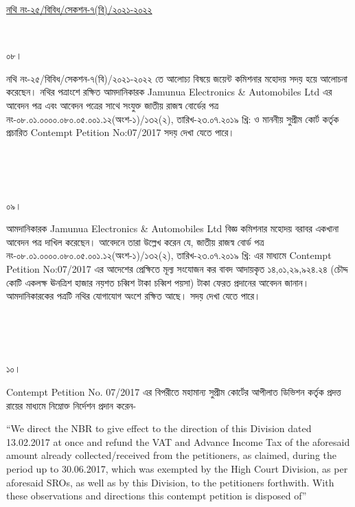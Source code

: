 \documentclass[12pt]{article}
\begin{document}
\begin{minipage}[t]{0.59\linewidth}
\hspace{0.5em}
\end{minipage}
\begin{minipage}[t]{1\textwidth}
\underline{নথি নং-২৫/বিবিধ/সেকশন-৭(বি)/২০২১-২০২২}
\end{minipage}
\\
\begin{minipage}[t]{0.05\linewidth}
০৮।
\end{minipage}
\begin{minipage}[t]{1\linewidth}
নথি নং-২৫/বিবিধ/সেকশন-৭(বি)/২০২১-২০২২
তে আলোচ্য বিষয়ে জয়েন্ট কমিশনার মহোদয়
সদয় হয়ে আলোচনা করেছেন।
নথির পত্রাংশে রক্ষিত আমদানিকারক
Jamunua Electronics \& Automobiles Ltd
এর আবেদন পত্র এবং আবেদন পত্রের সাথে সংযুক্ত
জাতীয় রাজস্ব বোর্ডের পত্র
নং-০৮.০১.০০০০.০৮০.০৫.০০১.১২(অংশ-১)/১৩২(২),
তারিখ-২৩.০৭.২০১৯ খ্রি:
ও মাননীয় সুপ্রীম কোর্ট কর্তৃক প্রচারিত
Contempt Petition No:07/2017
সদয় দেখা যেতে পারে।
\end{minipage}
\\
\\
\\
\begin{minipage}[t]{0.05\linewidth}
০৯।
\end{minipage}
\begin{minipage}[t]{1\linewidth}
আমদানিকারক
Jamunua Electronics \& Automobiles Ltd
বিজ্ঞ কমিশনার মহোদয় বরাবর
একখানা আবেদন পত্র দাখিল
করেছেন। আবেদনে তারা উল্লেখ করেন যে,
জাতীয় রাজস্ব বোর্ড পত্র
নং-০৮.০১.০০০০.০৮০.০৫.০০১.১২(অংশ-১)/১৩২(২),
তারিখ-২৩.০৭.২০১৯ খ্রি:
এর মাধ্যমে
Contempt Petition No:07/2017
এর আদেশের প্রেক্ষিতে মূল্য সংযোজন কর
বাবদ আদায়কৃত
১৪,০১,২৯,৯২৪.২৪
(চৌদ্দ কোটি একলক্ষ ঊনত্রিশ হাজার নয়শত চব্বিশ টাকা চব্বিশ পয়সা) টাকা
ফেরত প্রদানের আবেদন জানান।
আমদানিকারকের পত্রটি নথির যোগাযোগ
অংশে রক্ষিত আছে।
সদয় দেখা যেতে পারে।
\end{minipage}
\\
\\
\\
\begin{minipage}[t]{0.05\linewidth}
১০।
\end{minipage}
\begin{minipage}[t]{1\linewidth}
Contempt Petition No. 07/2017
এর বিপরীতে মহামান্য সুপ্রীম কোর্টের
আপীলাত ডিভিশন কর্তৃক প্রদত্ত রায়ের
মাধ্যমে নিম্নোক্ত নির্দেশন প্রদান করেন-


\hspace{1em}``We direct the NBR
to give effect to the direction
of this Division
dated 13.02.2017
at once and refund the VAT
and Advance Income Tax
of the aforesaid amount already
collected/received from the
petitioners, as claimed, during
the period up to 30.06.2017,
which was exempted by the
High Court Division, as per
aforesaid SROs, as well as by this
Division, to the  petitioners
forthwith. With these observations
and directions this contempt
petition is disposed of''
\end{minipage}
\end{document}
